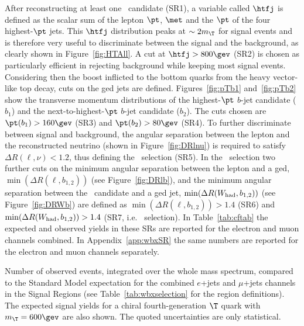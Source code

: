 After reconstructing at least one \whad\ candidate (SR1), a variable called $\htfj$ is defined
as the scalar sum of the lepton $\pt$, $\met$ and the $\pt$
of the four  highest-$\pt$ jets. This $\htfj$ distribution peaks at 
$\sim 2 m_{\T}$ for signal events and is therefore very useful to
discriminate between the signal and the background, as clearly shown
in Figure~\ref{fig:HTAll}. A cut at $\htfj>800\gev$ (SR2) is chosen as particularly
efficient in rejecting background while keeping most signal events.
Considering then the boost inflicted to the bottom quarks from the heavy
vector-like top decay, cuts on the \btag ged jets are defined.
Figures~\ref{fig:pTb1} and~\ref{fig:pTb2} show the transverse momentum distributions
of the highest-$\pt$ $b$-jet candidate ($b_1$) and 
the next-to-highest-$\pt$ $b$-jet candidate ($b_2$).
The cuts chosen are $\pt(b_1) > 160\gev$ (SR3) and $\pt(b_2) >80\gev$ (SR4).
To further discriminate between signal and background,
the angular separation between the lepton and the reconstructed neutrino 
(shown in Figure~\ref{fig:DRlnu}) is
required to satisfy $\Delta R(\ell,\nu)<1.2$, thus defining the 
\loose\ selection (SR5). In the \tight\ selection
two further cuts on the minimum angular separation between the lepton and a \btag ged, 
$\min(\Delta R(\ell, b_{1,2}))$ (see Figure~\ref{fig:DRlb}), 
and the minimum angular separation between the
\whad\ candidate and a \btag ged jet,
$\min(\Delta R(W_{\rm had}, b_{1,2}))$ (see Figure~\ref{fig:DRWb}) are defined as
 $\min(\Delta R(\ell, b_{1,2}))>1.4$ (SR6) and 
$\min(\Delta R(W_{\rm had}, b_{1,2}))>1.4$ (SR7, i.e. \tight\ selection).
In Table~\ref{tab:cftab} the expected and observed yields in these SRs are
reported for the electron and muon channels combined. In Appendix~\ref{app:wbxSR}
the same numbers are reported for the  electron and muon channels separately.

\begin{table}[htb]\centering
        
        \caption{Number of observed events, integrated 
          over the whole mass spectrum, compared to the Standard Model expectation for
          the combined $e$+jets and $\mu$+jets channels 
          in the Signal Regions (see Table~\ref{tab:wbxselection} for the
        region definitions).
          The expected signal yields for a chiral 
          fourth-generation $\T$ quark with $m_{\T}=600\gev$ are also shown.
          The quoted uncertainties are only statistical.}\label{tab:cftab}
\end{table}



